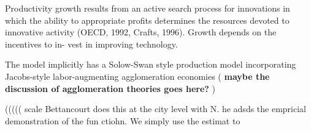 Productivity growth results from an active search process for innovations in which the ability to appropriate profits determines the resources devoted to innovative activity (OECD, 1992, Crafts, 1996). Growth depends on the incentives to in-
vest in improving technology.%
 









The model implicitly has a Solow-Swan style production model incorporating Jacobs-style labor-augmenting agglomeration economies (\textbf{\color{blue} maybe the discussion of agglomeration theories goes here? }) 



(((((   scale Bettancourt does this at the city level with N. he adsds the empricial demonstration of the fun ctiohn. We  simply use the estimat to 






\color{black}
